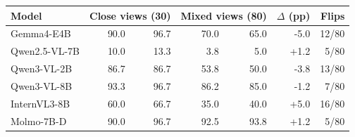 \begin{tabular}{lrrrrrr}
\toprule
Model & \multicolumn{2}{c}{Close views (30)} & \multicolumn{2}{c}{Mixed views (80)} & $\Delta$ (pp) & Flips \\
\midrule
Gemma4-E4B & 90.0 & 96.7 & 70.0 & 65.0 & -5.0 & 12/80 \\
Qwen2.5-VL-7B & 10.0 & 13.3 & 3.8 & 5.0 & +1.2 & 5/80 \\
Qwen3-VL-2B & 86.7 & 86.7 & 53.8 & 50.0 & -3.8 & 13/80 \\
Qwen3-VL-8B & 93.3 & 96.7 & 86.2 & 85.0 & -1.2 & 7/80 \\
InternVL3-8B & 60.0 & 66.7 & 35.0 & 40.0 & +5.0 & 16/80 \\
Molmo-7B-D & 90.0 & 96.7 & 92.5 & 93.8 & +1.2 & 5/80 \\
\bottomrule
\end{tabular}
